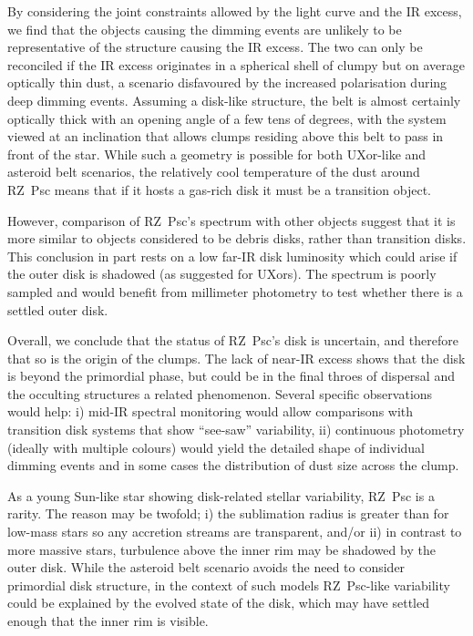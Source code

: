 \documentclass[]{rsos}
\begin{document}
By considering the joint constraints allowed by the light curve and the IR excess, we
find that the objects causing the dimming events are unlikely to be representative of the
structure causing the IR excess. The two can only be reconciled if the IR excess
originates in a spherical shell of clumpy but on average optically thin dust, a scenario
disfavoured by the increased polarisation during deep dimming events. Assuming a
disk-like structure, the belt is almost certainly optically thick with an opening angle
of a few tens of degrees, with the system viewed at an inclination that allows clumps
residing above this belt to pass in front of the star. While such a geometry is possible
for both UXor-like and asteroid belt scenarios, the relatively cool temperature of the
dust around RZ~Psc means that if it hosts a gas-rich disk it must be a transition object.

However, comparison of RZ~Psc's spectrum with other objects suggest that it is more
similar to objects considered to be debris disks, rather than transition disks. This
conclusion in part rests on a low far-IR disk luminosity which could arise if the outer
disk is shadowed (as suggested for UXors). The spectrum is poorly sampled and would
benefit from millimeter photometry to test whether there is a settled outer disk.

Overall, we conclude that the status of RZ~Psc's disk is uncertain, and therefore that so
is the origin of the clumps. The lack of near-IR excess shows that the disk is beyond the
primordial phase, but could be in the final throes of dispersal and the occulting
structures a related phenomenon. Several specific observations would help: i) mid-IR
spectral monitoring would allow comparisons with transition disk systems that show
``see-saw'' variability, ii) continuous photometry (ideally with multiple colours) would
yield the detailed shape of individual dimming events and in some cases the distribution
of dust size across the clump.

As a young Sun-like star showing disk-related stellar variability, RZ~Psc is a
rarity. The reason may be twofold; i) the sublimation radius is greater than for low-mass
stars so any accretion streams are transparent, and/or ii) in contrast to more massive
stars, turbulence above the inner rim may be shadowed by the outer disk. While the
asteroid belt scenario avoids the need to consider primordial disk structure, in the
context of such models RZ~Psc-like variability could be explained by the evolved state of
the disk, which may have settled enough that the inner rim is visible.
\end{document}
